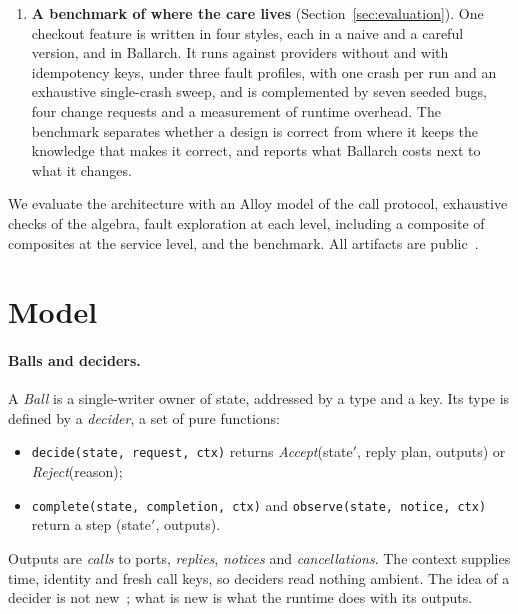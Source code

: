 \documentclass[11pt]{article}
\theoremstyle{definition}
\theoremstyle{plain}
\begin{document}
\begin{enumerate}[leftmargin=*]
  \item \textbf{A benchmark of where the care lives} (Section~\ref{sec:evaluation}). One checkout feature is written in four styles, each in a naive and a careful version, and in Ballarch. It runs against providers without and with idempotency keys, under three fault profiles, with one crash per run and an exhaustive single-crash sweep, and is complemented by seven seeded bugs, four change requests and a measurement of runtime overhead. The benchmark separates whether a design is correct from where it keeps the knowledge that makes it correct, and reports what Ballarch costs next to what it changes.
\end{enumerate}
We evaluate the architecture with an Alloy model of the call protocol, exhaustive checks of the algebra, fault exploration at each level, including a composite of composites at the service level, and the benchmark. All artifacts are public~\citep{BallarchRepo}.

\section{Model}
\label{sec:model}

\paragraph{Balls and deciders.} A \emph{Ball} is a single-writer owner of state, addressed by a type and a key. Its type is defined by a \emph{decider}, a set of pure functions:
\begin{itemize}[nosep]
  \item \texttt{decide(state, request, ctx)} returns \emph{Accept}(state$'$, reply plan, outputs) or \emph{Reject}(reason);
  \item \texttt{complete(state, completion, ctx)} and \texttt{observe(state, notice, ctx)} return a step (state$'$, outputs).
\end{itemize}
Outputs are \emph{calls} to ports, \emph{replies}, \emph{notices} and \emph{cancellations}. The context supplies time, identity and fresh call keys, so deciders read nothing ambient. The idea of a decider is not new~\citep{ElmGuide,Chassaing2021Decider}; what is new is what the runtime does with its outputs.
\end{document}
